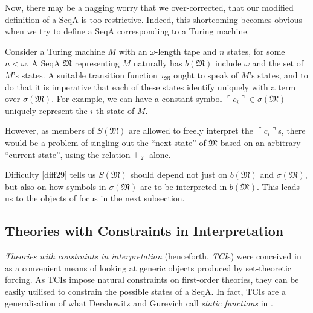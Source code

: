 \documentclass[12pt]{article}
\numberwithin{equation}{section}
\begin{document}
Now, there may be a nagging worry that we over-corrected, that our modified definition of a SeqA is too restrictive. Indeed, this shortcoming becomes obvious when we try to define a SeqA corresponding to a Turing machine.

\begin{diff}\label{diff29}
Consider a Turing machine $M$ with an $\omega$-length tape and $n$ states, for some $n < \omega$. A SeqA $\mathfrak{M}$ representing $M$ naturally has $b(\mathfrak{M})$ include $\omega$ and the set of $M$'s states. A suitable transition function $\tau_{\mathfrak{M}}$ ought to speak of $M$'s states, and to do that it is imperative that each of these states identify uniquely with a term over $\sigma(\mathfrak{M})$. For example, we can have a constant symbol $\ulcorner c_i \urcorner \in \sigma(\mathfrak{M})$ uniquely represent the $i$-th state of $M$. 

However, as members of $S(\mathfrak{M})$ are allowed to freely interpret the $\ulcorner c_i \urcorner$s, there would be a problem of singling out the ``next state'' of $\mathfrak{M}$ based on an arbitrary ``current state'', using the relation $\models_2$ alone.
\end{diff}

Difficulty \ref{diff29} tells us $S(\mathfrak{M})$ should depend not just on $b(\mathfrak{M})$ and $\sigma(\mathfrak{M})$, but also on how symbols in $\sigma(\mathfrak{M})$ are to be interpreted in $b(\mathfrak{M})$. This leads us to the objects of focus in the next subsection.

\subsection{Theories with Constraints in Interpretation}\label{ssect23}

\emph{Theories with constraints in interpretation} (henceforth, \emph{TCI}s) were conceived in \cite{myself} as a convenient means of looking at generic objects produced by set-theoretic forcing. As TCIs impose natural constraints on first-order theories, they can be easily utilised to constrain the possible states of a SeqA. In fact, TCIs are a generalisation of what Dershowitz and Gurevich call \textit{static functions} in \cite{dershowitz}.
\end{document}

